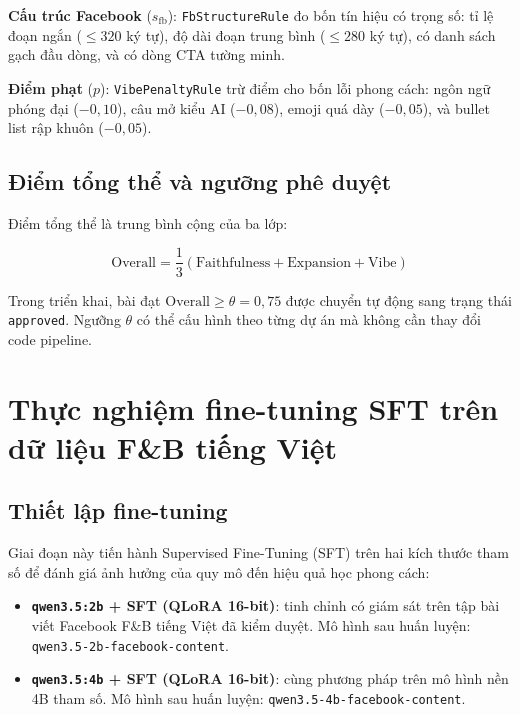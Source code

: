 \textbf{Cấu trúc Facebook} ($s_{\text{fb}}$):
\texttt{FbStructureRule} đo bốn tín hiệu có trọng số: tỉ lệ đoạn
ngắn ($\leq 320$ ký tự), độ dài đoạn trung bình ($\leq 280$ ký tự),
có danh sách gạch đầu dòng, và có dòng CTA tường minh.

\textbf{Điểm phạt} ($p$): \texttt{VibePenaltyRule} trừ điểm cho bốn
lỗi phong cách: ngôn ngữ phóng đại ($-0{,}10$), câu mở kiểu AI
($-0{,}08$), emoji quá dày ($-0{,}05$), và bullet list rập khuôn
($-0{,}05$).

\subsection{Điểm tổng thể và ngưỡng phê duyệt}

Điểm tổng thể là trung bình cộng của ba lớp:

\begin{equation}
  \text{Overall} = \frac{1}{3}(\text{Faithfulness} + \text{Expansion} + \text{Vibe})
  \label{eq:overall}
\end{equation}

Trong triển khai, bài đạt $\text{Overall} \geq \theta = 0{,}75$ được
chuyển tự động sang trạng thái \texttt{approved}. Ngưỡng $\theta$ có
thể cấu hình theo từng dự án mà không cần thay đổi code pipeline.

\section{Thực nghiệm fine-tuning SFT trên dữ liệu F\&B tiếng Việt}
\label{sec:fine-tuning-result}

\subsection{Thiết lập fine-tuning}

Giai đoạn này tiến hành Supervised Fine-Tuning (SFT) trên hai kích
thước tham số để đánh giá ảnh hưởng của quy mô đến hiệu quả học phong
cách:

\begin{itemize}
  \item \textbf{\texttt{qwen3.5:2b} + SFT (QLoRA 16-bit)}: tinh chỉnh
    có giám sát trên tập bài viết Facebook F\&B tiếng Việt đã kiểm
    duyệt. Mô hình sau huấn luyện:
    \texttt{qwen3.5-2b-facebook-content}.
  \item \textbf{\texttt{qwen3.5:4b} + SFT (QLoRA 16-bit)}: cùng phương
    pháp trên mô hình nền 4B tham số. Mô hình sau huấn luyện:
    \texttt{qwen3.5-4b-facebook-content}.
\end{itemize}

